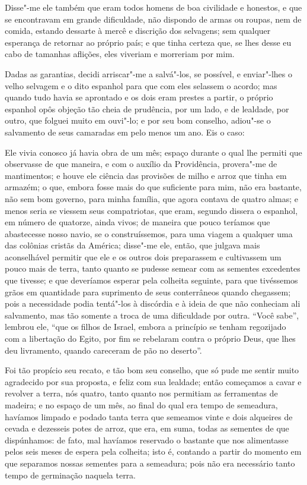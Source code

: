 Disse"-me ele também que eram todos homens de boa civilidade e honestos,
e que se encontravam em grande dificuldade, não dispondo de armas ou
roupas, nem de comida, estando dessarte à mercê e discrição dos
selvagens; sem qualquer esperança de retornar ao próprio país; e que
tinha certeza que, se lhes desse eu cabo de tamanhas aflições, eles
viveriam e morreriam por mim.

Dadas as garantias, decidi arriscar"-me a salvá"-los, se possível, e
enviar"-lhes o velho selvagem e o dito espanhol para que com eles
selassem o acordo; mas quando tudo havia se aprontado e os dois eram
prestes a partir, o próprio espanhol opôs objeção tão cheia de
prudência, por um lado, e de lealdade, por outro, que folguei muito em
ouvi"-lo; e por seu bom conselho, adiou"-se o salvamento de seus camaradas
em pelo menos um ano. Eis o caso:

Ele vivia conosco já havia obra de um mês; espaço durante o qual lhe
permiti que observasse de que maneira, e com o auxílio da Providência,
provera"-me de mantimentos; e houve ele ciência das provisões de milho e
arroz que tinha em armazém; o que, embora fosse mais do que suficiente
para mim, não era bastante, não sem bom governo, para minha família, que
agora contava de quatro almas; e menos seria se viessem seus
compatriotas, que eram, segundo dissera o espanhol, em número de
quatorze, ainda vivos; de maneira que pouco teríamos que abastecesse
nosso navio, se o construíssemos, para uma viagem a qualquer uma das
colônias cristãs da América; disse"-me ele, então, que julgava mais
aconselhável permitir que ele e os outros dois preparassem e cultivassem
um pouco mais de terra, tanto quanto se pudesse semear com as sementes
excedentes que tivesse; e que deveríamos esperar pela colheita seguinte,
para que tivéssemos grãos em quantidade para suprimento de seus
conterrâneos quando chegassem; pois a necessidade podia tentá"-los à
discórdia e à ideia de que não conheciam ali salvamento, mas tão somente
a troca de uma dificuldade por outra. ``Você sabe'', lembrou ele, ``que
os filhos de Israel, embora a princípio se tenham regozijado com a
libertação do Egito, por fim se rebelaram contra o próprio Deus, que
lhes deu livramento, quando careceram de pão no deserto''.

Foi tão propício seu recato, e tão bom seu conselho, que só pude me
sentir muito agradecido por sua proposta, e feliz com sua lealdade;
então começamos a cavar e revolver a terra, nós quatro, tanto quanto nos
permitiam as ferramentas de madeira; e no espaço de um mês, ao final do
qual era tempo de semeadura, havíamos limpado e podado tanta terra que
semeamos vinte e dois alqueires de cevada e dezesseis potes de arroz,
que era, em suma, todas as sementes de que dispúnhamos: de fato, mal
havíamos reservado o bastante que nos alimentasse pelos seis meses de
espera pela colheita; isto é, contando a partir do momento em que
separamos nossas sementes para a semeadura; pois não era necessário
tanto tempo de germinação naquela terra.

